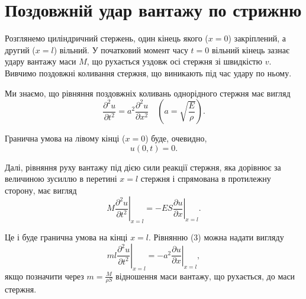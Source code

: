 
\section{Поздовжній удар вантажу по стрижню}

Розглянемо циліндричний стержень, один кінець якого ($x=0$) закріплений, а другий ($x=l$) вільний. У початковий момент часу $t=0$ вільний кінець зазнає удару вантажу маси $M$, що рухається уздовж осі стержня зі швидкістю $v$. Вивчимо поздовжні коливання стержня, що виникають під час удару по ньому.

Ми знаємо, що рівняння поздовжніх коливань однорідного стержня має вигляд
\begin{equation}
	\frac{\partial^2 u}{\partial t^2} = a^2 \frac{\partial^2 u}{\partial x^2} \quad \left(a = \sqrt{\frac{E}{\rho}}\right).
\end{equation}

Гранична умова на лівому кінці ($x=0$) буде, очевидно,
\begin{equation}
	u(0, t) = 0.
\end{equation}

Далі, рівняння руху вантажу під дією сили реакції стержня, яка дорівнює за величиною зусиллю в перетині $x=l$ стержня і спрямована в протилежну сторону, має вигляд
\begin{equation}
	M \left.\frac{\partial^2 u}{\partial t^2}\right|_{x=l} = -ES \left.\frac{\partial u}{\partial x}\right|_{x=l}.
\end{equation}

Це і буде гранична умова на кінці $x=l$. Рівнянню (3) можна надати вигляду
\begin{equation}
	ml \left.\frac{\partial^2 u}{\partial t^2}\right|_{x=l} = -a^2 \left.\frac{\partial u}{\partial x}\right|_{x=l},
\end{equation}
якщо позначити через $m = \frac{M}{\rho S}$ відношення маси вантажу, що рухається, до маси стержня.

